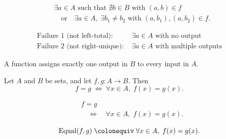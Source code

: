 \begin{remark*}
\[
\begin{aligned}
&\exists a \in A \text{ such that } \nexists b \in B \text{ with } (a,b)\in f \\
&\quad\text{or}\quad
\exists a \in A,\; \exists b_1 \ne b_2 \text{ with } (a,b_1),(a,b_2)\in f.
\end{aligned}
\]
\end{remark*}

\begin{remark*}
\[
\begin{aligned}
\text{Failure 1 (not left-total): } 
&\exists a \in A \text{ with no output} \\
\text{Failure 2 (not right-unique): } 
&\exists a \in A \text{ with multiple outputs}
\end{aligned}
\]
\end{remark*}

\begin{remark*}[Interpretation]
A function assigns exactly one output in $B$ to every input in $A$.
\end{remark*}







\begin{tcolorbox}[title={Axiom --- Extensionality of Functions}]
\begin{axiom}
\label{ax:extensionality-of-functions}
Let $A$ and $B$ be sets, and let $f, g : A \to B$. Then
\[
f = g
\;\Longleftrightarrow\;
\forall x \in A,\; f(x) = g(x).
\]
\end{axiom}
\end{tcolorbox}

\begin{remark*}
\[
\begin{aligned}
&f = g \\
&\quad\Longleftrightarrow\quad
\forall x \in A,\; f(x) = g(x).
\end{aligned}
\]
\end{remark*}

\begin{remark*}
\[
\operatorname{Equal}(f,g)
\;\colonequiv\;
\forall x \in A,\; f(x) = g(x).
\]
\end{remark*}

